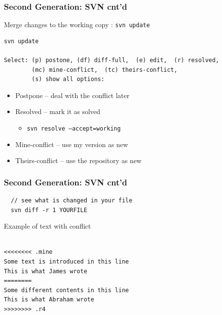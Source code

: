 \documentclass[newPxFont,sthlmFooter,nooffset]{beamer}
\begin{document}
\begin{frame}[fragile,t]
  \frametitle{Second Generation: SVN cnt'd}
Merge changes to the working copy : \texttt{svn update}

\begin{verbatim}
svn update

Select: (p) postone, (df) diff-full,  (e) edit,  (r) resolved,
        (mc) mine-conflict,  (tc) theirs-conflict, 
        (s) show all options: 
\end{verbatim}
\begin{itemize}
\item Postpone – deal with the conflict later
\item Resolved – mark it as solved
\begin{itemize}
\item \texttt{svn resolve –accept=working}
\end{itemize}
\item Mine-conflict – use my version as new
\item Theirs-conflict – use the repository as new
\end{itemize}
\end{frame}


\begin{frame}[fragile,t]
  \frametitle{Second Generation: SVN cnt'd}
\begin{verbatim}
  // see what is changed in your file
  svn diff -r 1 YOURFILE
\end{verbatim}


Example of text with conflict
\begin{verbatim}

<<<<<<<< .mine
Some text is introduced in this line
This is what James wrote
========
Some different contents in this line
This is what Abraham wrote
>>>>>>>> .r4
\end{verbatim}


\end{frame}
\end{document}
